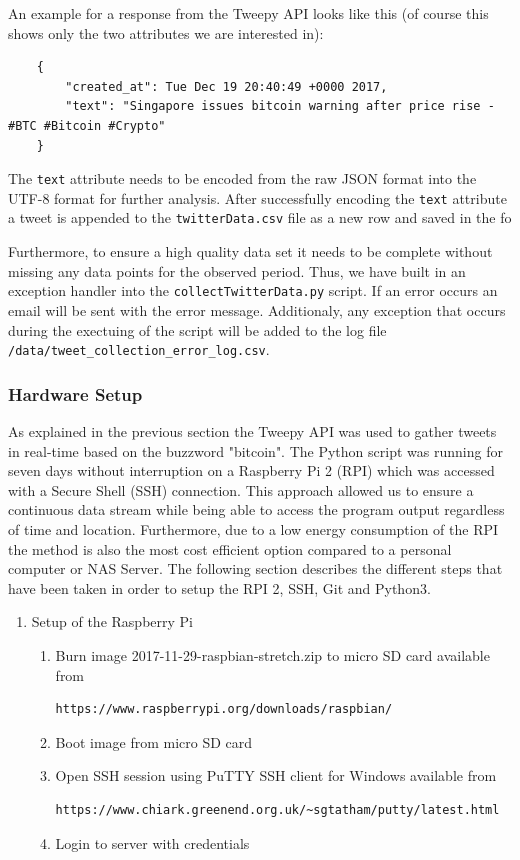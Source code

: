\documentclass[a4paper,12pt]{article}
\begin{document}
\begin{spacing}{1.2}
An example for a response from the Tweepy API looks like this (of course this shows only the two attributes we are interested in):
\begin{lstlisting}
    {
        "created_at": Tue Dec 19 20:40:49 +0000 2017, 
        "text": "Singapore issues bitcoin warning after price rise - #BTC #Bitcoin #Crypto"
    }
\end{lstlisting}

The \verb|text| attribute needs to be encoded from the raw JSON format into the UTF-8 format for further analysis. After successfully encoding the \verb|text| attribute a tweet is appended to the \verb|twitterData.csv| file as a new row and saved in the fo

Furthermore, to ensure a high quality data set it needs to be complete without missing any data points for the observed period. Thus, we have built in an exception handler into the \verb|collectTwitterData.py| script. If an error occurs an email will be sent with the error message. Additionaly, any exception that occurs during the exectuing of the script will be added to the log file \verb|/data/tweet_collection_error_log.csv|.

\subsubsection{Hardware Setup}
As explained in the previous section the Tweepy API was used to gather tweets in real-time based on the buzzword "bitcoin". The Python script was running for seven days without interruption on a Raspberry Pi 2 (RPI) which was accessed with a Secure Shell (SSH) connection. This approach allowed us to ensure a continuous data stream while being able to access the program output regardless of time and location. Furthermore, due to a low energy consumption of the RPI the method is also the most cost efficient option compared to a personal computer or NAS Server. The following section describes the different steps that have been taken in order to setup the RPI 2, SSH, Git and Python3.\\

\begin{enumerate}

\item Setup of the Raspberry Pi
\begin{enumerate}
\item Burn image 2017-11-29-raspbian-stretch.zip to micro SD card available from
\begin{lstlisting}[language=bash]
https://www.raspberrypi.org/downloads/raspbian/
\end{lstlisting}
\item Boot image from micro SD card 
\item Open SSH session using PuTTY SSH client for Windows available from
\begin{lstlisting}[language=bash] 
https://www.chiark.greenend.org.uk/~sgtatham/putty/latest.html
\end{lstlisting}
\item Login to server with credentials 
\end{enumerate}


\end{enumerate}
\end{spacing}
\end{document}
